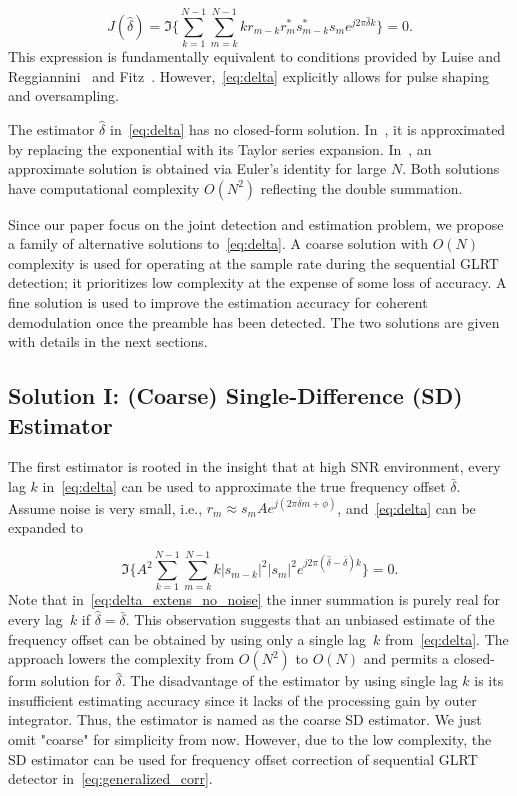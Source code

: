 \begin{equation}
    \label{eq:delta}
    J(\hat{\delta}) = \Im\bigg\{\sum_{k=1}^{N-1}{\sum_{m=k}^{N-1}{kr_{m-k}r_m^{*}s_{m-k}^{*}s_m}e^{j2\pi\hat{\delta}k}}\bigg\}=0.
    \end{equation}
This expression is fundamentally equivalent to conditions provided by Luise and Reggiannini~\cite{Luise_Reggiannini_95} and Fitz~\cite{Fitz_94}.
However,~\eqref{eq:delta} explicitly allows for pulse shaping and oversampling.

The estimator $\hat{\delta}$ in~\eqref{eq:delta} has no closed-form
solution.
In~\cite{Luise_Reggiannini_95}, it is approximated by replacing the exponential with its
Taylor series expansion.
In~\cite{Fitz_94}, an approximate solution is obtained via Euler's
identity for large $N$.
Both solutions have computational complexity $O(N^2)$ reflecting the
double summation.

Since our paper focus on the joint detection and estimation problem, we propose a family of alternative solutions to~\eqref{eq:delta}.
A coarse solution with $O(N)$ complexity is used for operating at the sample
rate during the sequential GLRT detection;
it prioritizes low complexity at the expense of some loss of accuracy.
A fine solution is used to improve the estimation accuracy for coherent demodulation once the preamble has been detected.
The two solutions are given with details in the next sections.

\subsection{Solution I: (Coarse) Single-Difference (SD) Estimator}

The first estimator is rooted in the insight that at high SNR environment, every lag $k$ in~\eqref{eq:delta} can be used to
approximate the true frequency offset $\bar{\delta}$. Assume noise is very small, i.e.,
$r_m \approx s_mAe^{j(2\pi \bar{\delta} m+\phi)}$, and~\eqref{eq:delta} can be expanded to

\begin{equation}
    \label{eq:delta_extens_no_noise}
    \Im\bigg\{A^2\sum_{k=1}^{N-1}\sum_{m=k}^{N-1}k|s_{m-k}|^2|s_m|^2e^{j2\pi (\hat{\delta}-\bar{\delta})k}\bigg\}=0.
    \end{equation}
Note that in~\eqref{eq:delta_extens_no_noise} the inner summation is purely real for every lag~$k$ if $\hat{\delta}=\bar{\delta}$.
This observation suggests that an unbiased estimate of the frequency offset can be obtained by using only a single lag~$k$
from~\eqref{eq:delta}. The approach lowers the complexity from $O(N^2)$ to $O(N)$ and permits a closed-form solution for $\hat{\delta}$.  
The disadvantage of the estimator by using single lag $k$ is its insufficient estimating accuracy since it lacks of the processing gain by outer integrator.
Thus, the estimator is named as the coarse SD estimator. We just omit "coarse" for simplicity from now.
However, due to the low complexity, the SD estimator can be used for 
frequency offset correction of sequential GLRT detector in~\eqref{eq:generalized_corr}. 


